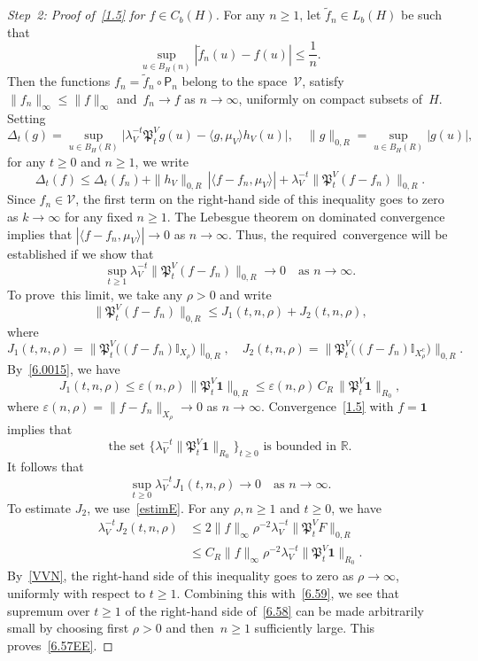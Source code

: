 \documentclass[10pt]{amsart}
\theoremstyle{definition}\newtheorem{defi}[theo]{Definition}\newtheorem{rema}[theo]{Remark}\newtheorem{exam}[theo]{Example}\newtheorem{exem}[theo]{Example}\newtheorem{nota}[theo]{Notation}
\newcommand{\e}{\varepsilon}
\newcommand{\mek}{{\mathbf 1}}
\newcommand{\R}{{\mathbb R}}
\newcommand{\I}{{\mathbb I}}
\newcommand{\VV}{{\mathcal V}}
\newcommand{\la}{\lambda}
\newcommand{\PPPP}{{\mathfrak P}}
\newenvironment{step}{\begin{proof}}{\let\qed\relax \end{proof}}
\begin{document}
\begin{step}[Step~2: Proof of~\eqref{1.5} for $f\in C_b(H)$]
For any $n\ge1$, let $\tilde f_n\in L_b(H)$ be such that
\[
\sup_{u\in B_H(n)}|\tilde f_n(u)-f(u)|\le\frac1n.
\]
Then the functions $f_n={\tilde f}_n\circ{\mathsf P}_n$ belong to the space~$\VV$, satisfy $\|f_n\|_\infty\le \|f\|_\infty$ and~$f_n\to f$ as $n\to\infty$, uniformly on compact subsets of~$H$. Setting
\[
\Delta_t(g)=\sup_{u\in B_H(R)}\bigl|\lambda_V^{-t}\PPPP_t^Vg(u)-\langle g,\mu_V\rangle h_V(u)\bigr|,
\quad \|g\|_{0,R}=\sup_{u\in B_H(R)}|g(u)|,
\]
for any $t\ge0$ and $n\ge1$, we write
\[
\Delta_t(f)\le \Delta_t(f_n)+\|h_V\|_{0,R}\,|\langle f-f_n,\mu_V\rangle|+\lambda_V^{-t}\|\PPPP_t^V(f-f_n)\|_{0,R}.
\]
Since $f_n\in\VV$, the first term on the right-hand side of this inequality goes to zero as $k\to\infty$ for any fixed $n\ge1$. The Lebesgue theorem on dominated convergence implies that $|\langle f-f_n,\mu_V\rangle|\to0$ as $n\to\infty$. Thus, the required~convergence will be established if we show that
\begin{equation}\label{6.57EE}
\sup_{t\ge 1}\lambda_V^{-t}\|\PPPP_t^V(f-f_n)\|_{0,R}\to0\quad\mbox{as $n\to\infty$}.
\end{equation}
To prove~this limit, we take any $\rho>0$ and write
\begin{equation}\label{6.58}
\|\PPPP_t^V(f-f_n)\|_{0,R}\le J_1(t,n,\rho)+J_2(t,n,\rho),
\end{equation}
where
\[
J_1(t,n,\rho)=\|\PPPP_t^V\bigl((f-f_n)\I_{X_\rho}\bigr)\bigr\|_{0,R}, \quad J_2(t,n,\rho)=\|\PPPP_t^V\bigl((f-f_n)\I_{X_\rho^c}\bigr)\|_{0,R}.
\]
By~\eqref{6.0015}, we have
\[
J_1(t,n,\rho)\le \e(n,\rho)\,\|\PPPP_t^V\mathbf1\|_{0,R} \le \e(n,\rho)\,C_R \,\|\PPPP_t^V\mathbf1\|_{R_0},
\]
where $\e(n,\rho)=\|f-f_n\|_{X_\rho}\to0$ as $n\to\infty$. Convergence~\eqref{1.5} with $f=\mathbf1$ implies that
\begin{equation}\label{VVN}
\text{the set $\{\lambda_V^{-t}\|\PPPP_t^V{\mek }\|_{R_0}\}_{t\ge0}$ is bounded in $\R$.}
\end{equation}
It follows that
\begin{equation}\label{6.59}
\sup_{t\ge 0}\lambda_V^{-t}J_1(t,n,\rho) \to0\quad\mbox{as $n\to\infty$}.
\end{equation}
To estimate $J_2$, we use~\eqref{estimE}. For any $ \rho,n \ge1$ and $t\ge0$, we have
\begin{align*}
\la_V^{-t}J_2(t,n,\rho) &\le 2\|f\|_\infty \rho ^{-2} \la_V^{-t} \|\PPPP_t^V F \|_{0,R}\\
&\le C_R\|f\|_\infty \rho ^{-2} \la_V^{-t}\|\PPPP_t^V{\mathbf1}\|_{R_0}.
\end{align*}
By~\eqref{VVN}, the right-hand side of this inequality goes to zero as $\rho\to\infty$, uniformly with respect to $t\ge1$. Combining this with~\eqref{6.59}, we see that supremum over $t\ge 1$ of the right-hand side of~\eqref{6.58} can be made arbitrarily small by choosing first $\rho>0$ and then~$n\ge1$ sufficiently large. This proves~\eqref{6.57EE}.
\end{step}
\end{document}
